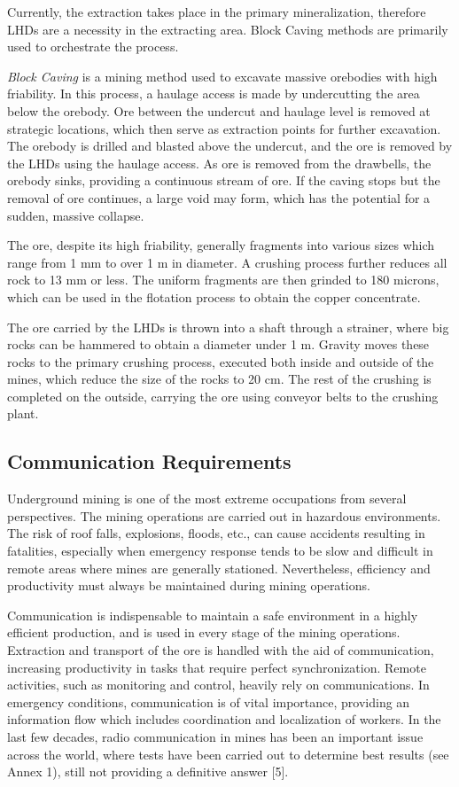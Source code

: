 Currently, the extraction takes place in the primary mineralization, therefore LHDs are a necessity in the extracting area. Block Caving methods are primarily used to orchestrate the process. 

\emph{Block Caving} is a mining method used to excavate massive orebodies with high friability. In this process, a haulage access is made by undercutting the area below the orebody. Ore between the undercut and haulage level is removed at strategic locations, which then serve as extraction points for further excavation. The orebody is drilled and blasted above the undercut, and the ore is removed by the LHDs using the haulage access. As ore is removed from the drawbells, the orebody sinks, providing a continuous stream of ore. If the caving stops but the removal of ore continues, a large void may form, which has the potential for a sudden, massive collapse.

The ore, despite its high friability, generally fragments into various sizes which range from 1 mm to over 1 m in diameter. A crushing process further reduces all rock to 13 mm or less. The uniform fragments are then grinded to 180 microns, which can be used in the flotation process to obtain the copper concentrate.

The ore carried by the LHDs is thrown into a shaft through a strainer, where big rocks can be hammered to obtain a diameter under 1 m. Gravity moves these rocks to the primary crushing process, executed both inside and outside of the mines, which reduce the size of the rocks to 20 cm. The rest of the crushing is completed on the outside, carrying the ore using conveyor belts to the crushing plant. 


\subsection{Communication Requirements}

Underground mining is one of the most extreme occupations from several perspectives. The mining operations are carried out in hazardous environments. The risk of roof falls, explosions, floods, etc., can cause accidents resulting in fatalities, especially when emergency response tends to be slow and difficult in remote areas where mines are generally stationed. Nevertheless, efficiency and productivity must always be maintained during mining operations.

Communication is indispensable to maintain a safe environment in a highly efficient production, and is used in every stage of the mining operations. Extraction and transport of the ore is handled with the aid of communication, increasing productivity in tasks that require perfect synchronization. Remote activities, such as monitoring and control, heavily rely on communications. In emergency conditions, communication is of vital importance, providing an information flow which includes coordination and localization of workers. In the last few decades, radio communication in mines has been an important issue across the world, where tests have been carried out to determine best results (see Annex 1), still not providing a definitive answer [5].


